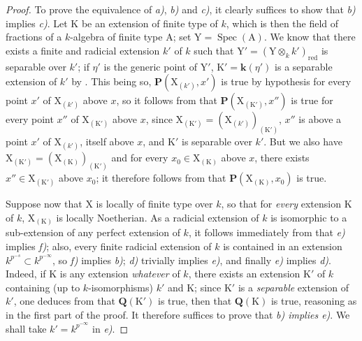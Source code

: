 \begin{proof}
To prove the equivalence of \emph{a)}, \emph{b)} and \emph{c)}, it clearly suffices to show that \emph{b)} implies \emph{c)}. Let $\mathrm{K}$ be an extension of finite type of $k$, which is then the field of fractions of a $k$-algebra of finite type $\mathrm{A}$; set $\mathrm{Y}=\operatorname{Spec}(\mathrm{A})$. We know  that there exists a finite and radicial extension $k'$ of $k$ such that $\mathrm{Y}'=(\mathrm{Y}\otimes_k k')_{\mathrm{red}}$ is separable over $k'$; if $\eta'$ is the generic point of $\mathrm{Y}'$, $\mathrm{K}'=\boldsymbol{k}(\eta')$ is a separable extension of $k'$ by . This being so, $\boldsymbol{P}(\mathrm{X}_{(k')},x')$ is true by hypothesis for every point $x'$ of $\mathrm{X}_{(k')}$ above $x$, so it follows from  that $\boldsymbol{P}(\mathrm{X}_{(\mathrm{K}')},x'')$ is true for every point $x''$ of $\mathrm{X}_{(\mathrm{K}')}$ above $x$, since $\mathrm{X}_{(\mathrm{K}')}=(\mathrm{X}_{(k')})_{(\mathrm{K}')}$, $x''$ is above a point $x'$ of $\mathrm{X}_{(k')}$, itself above $x$, and $\mathrm{K}'$ is separable over $k'$. But we also have $\mathrm{X}_{(\mathrm{K}')}=(\mathrm{X}_{(\mathrm{K})})_{(\mathrm{K}')}$ and for every $x_0\in\mathrm{X}_{(\mathrm{K})}$ above $x$, there exists $x''\in\mathrm{X}_{(\mathrm{K}')}$ above $x_0$; it therefore follows from  that $\boldsymbol{P}(\mathrm{X}_{(\mathrm{K})},x_0)$ is true.

Suppose now that $\mathrm{X}$ is locally of finite type over $k$, so that for \emph{every} extension $\mathrm{K}$ of $k$, $\mathrm{X}_{(\mathrm{K})}$ is locally Noetherian. As a radicial extension of $k$ is isomorphic to a sub-extension of any perfect extension of $k$, it follows immediately from  that \emph{e)} implies \emph{f)}; also, every finite radicial extension of $k$ is contained in an extension $k^{p^{-s}}\subset k^{p^{-\infty}}$, so \emph{f)} implies \emph{b)}; \emph{d)} trivially implies \emph{e)}, and finally \emph{e)} implies \emph{d)}. Indeed, if $\mathrm{K}$ is any extension \emph{whatever} of $k$, there exists an extension $\mathrm{K}'$ of $k$ containing (up to $k$-isomorphisms) $k'$ and $\mathrm{K}$; since $\mathrm{K}'$ is a \emph{separable} extension of $k'$, one deduces from  that $\boldsymbol{Q}(\mathrm{K}')$ is true, then that $\boldsymbol{Q}(\mathrm{K})$ is true, reasoning as in the first part of the proof. It therefore suffices to prove that \emph{b) implies e)}. We shall take $k'=k^{p^{-\infty}}$ in \emph{e)}.


\end{proof}
